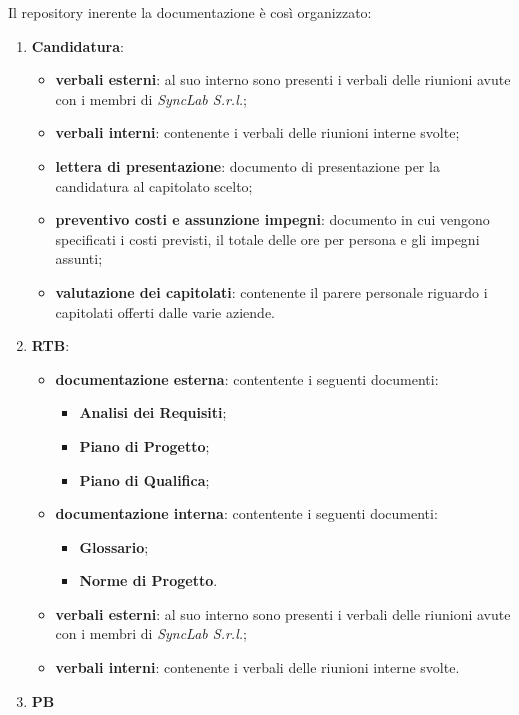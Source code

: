 Il repository inerente la documentazione è così organizzato:
\begin{enumerate}
	\item \textbf{Candidatura}:
	      \begin{itemize}
		      \item \textbf{verbali esterni}: al suo interno sono presenti i verbali delle riunioni avute con i membri di \textit{SyncLab S.r.l.};
		      \item \textbf{verbali interni}: contenente i verbali delle riunioni interne svolte;
		      \item \textbf{lettera di presentazione}: documento di presentazione per la candidatura al capitolato scelto;
		      \item \textbf{preventivo costi e assunzione impegni}: documento in cui vengono specificati i costi previsti, il totale delle ore per persona e gli impegni assunti;
		      \item \textbf{valutazione dei capitolati}: contenente il parere personale riguardo i capitolati offerti dalle varie aziende.
	      \end{itemize}
	\item \textbf{RTB}:
	      \begin{itemize}
		      \item \textbf{documentazione esterna}: contentente i seguenti documenti:
			  \begin{itemize}
				\item \textbf{Analisi dei Requisiti};
				\item \textbf{Piano di Progetto};
				\item \textbf{Piano di Qualifica};
			  \end{itemize}
			 	\item \textbf{documentazione interna}: contentente i seguenti documenti:
			  \begin{itemize}
				\item \textbf{Glossario};	
				\item \textbf{Norme di Progetto}.
			  \end{itemize}
			  \item \textbf{verbali esterni}: al suo interno sono presenti i verbali delle riunioni avute con i membri di \textit{SyncLab S.r.l.};
		      \item \textbf{verbali interni}: contenente i verbali delle riunioni interne svolte.
	      \end{itemize}
	\item \textbf{PB} %
\end{enumerate}

